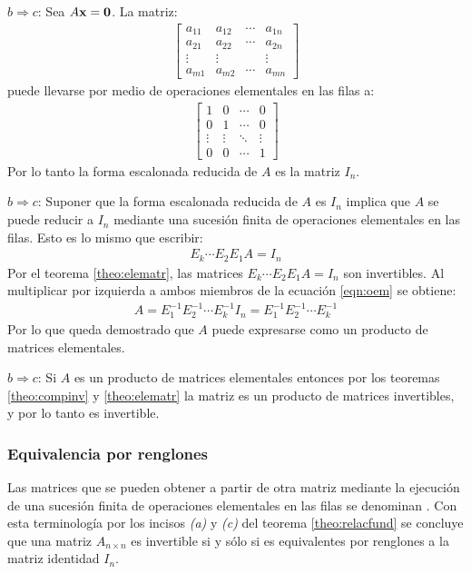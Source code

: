 \documentclass[a4paper,12pt]{article}
\begin{document}
$b\Rightarrow c$: Sea $A\textbf{x}=\textbf{0}$. La matriz:
\begin{align*}
  \begin{bmatrix}
    a_{11}& a_{12}& \cdots& a_{1n} \\
    a_{21}& a_{22}& \cdots& a_{2n} \\
    \vdots&\vdots &       &\vdots  \\
    a_{m1}& a_{m2}& \cdots& a_{mn} 
  \end{bmatrix}
\end{align*}
puede llevarse por medio de operaciones elementales en las filas a:
\begin{align*}
  \begin{bmatrix}
    1&   0& \cdots& 0 \\
    0&   1& \cdots& 0 \\
    \vdots&\vdots & \ddots  &\vdots  \\
    0&   0& \cdots& 1 
  \end{bmatrix}
\end{align*}
Por lo tanto la forma escalonada reducida de $A$ es la matriz $I_n$.

$b\Rightarrow c$: Suponer que la forma escalonada reducida de $A$ es
$I_n$ implica que $A$ se puede reducir a $I_n$ mediante una sucesión finita de
operaciones elementales en las filas. Esto es lo mismo que escribir:
\begin{align}
  E_k\cdots E_2E_1A=I_n
  \label{eqn:oem}
\end{align}
Por el teorema \ref{theo:elematr}, las matrices $E_k\cdots E_2E_1A=I_n$ son
invertibles. Al multiplicar por izquierda a ambos miembros de la ecuación
\eqref{eqn:oem} se obtiene:
\begin{align*}
  A=E_1^{-1}E_2^{-1}\cdots E_k^{-1}I_n=E_1^{-1}E_2^{-1}\cdots E_k^{-1}
\end{align*}
Por lo que queda demostrado que $A$ puede expresarse como un producto de
matrices elementales.

$b\Rightarrow c$: Si $A$ es un producto de matrices elementales entonces por
los teoremas \ref{theo:compinv} y \ref{theo:elematr} la matriz es un producto
de matrices invertibles, y por lo tanto es invertible.

\subsubsection{Equivalencia por renglones}
Las matrices que se pueden obtener a partir de otra matriz mediante la
ejecución de una sucesión finita de operaciones elementales en las filas se
denominan . Con esta terminología por los
incisos \emph{(a)} y \emph{(c)} del teorema \ref{theo:relacfund} se concluye
que una matriz $A_{n\times n}$ es invertible si y sólo si es equivalentes por
renglones a la matriz identidad $I_{n}$.
\end{document}
